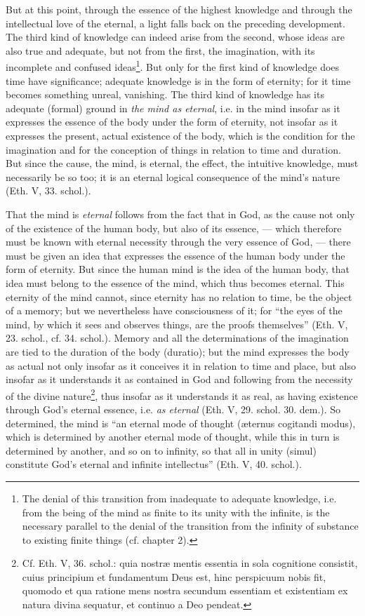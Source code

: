 \documentclass[12pt,a4paper,openany]{book}
\newcommand{\opage}[1]{\marginnote{\footnotesize\textit{[#1]}}}
\begin{document}
But at this point, through the essence of the highest
knowledge and through the intellectual love
of the eternal, a light falls back on the preceding development.
The third kind of knowledge can indeed arise
from the second, whose ideas are also true and adequate,
but not from the first, the imagination, with its incomplete
and confused ideas\footnote{The denial of this transition from inadequate to adequate
knowledge, i.e. from the being of the mind as finite to its unity with
the infinite, is the necessary parallel to the denial of the transition
from the infinity of substance to existing finite things
(cf. chapter 2).}. But only for the first
kind of knowledge does time have significance; adequate knowledge
is in the form of eternity; for it time becomes something
unreal, vanishing. The third kind of knowledge has its
adequate (formal) ground in \emph{the mind as eternal}, i.e. in the mind
insofar as it expresses the essence of the body under the form of
eternity, not insofar as it expresses the present,
actual existence of the body, which is the condition for the imagination and
for the conception of things in relation to time and duration.
But since the cause, the mind, is eternal, the effect, the
intuitive knowledge, must necessarily be so too; it is
an eternal logical consequence of the mind's nature (Eth. V, 33. schol.).

That the mind is \emph{eternal} follows from the fact that in God, as the
cause not only of the existence of the human body,
\opage{168}\setcounter{footnote}{0}but also of its essence, --- which therefore must be known with eternal necessity
through the very essence of God, --- there must
be given an idea that expresses the essence of the human body
under the form of eternity. But since the human
mind is the idea of the human body, that idea must
belong to the essence of the mind, which thus becomes eternal. This
eternity of the mind cannot, since eternity has no relation
to time, be the object of a memory; but we nevertheless have
consciousness of it; for ``the eyes of the mind, by which it
sees and observes things, are the proofs themselves'' (Eth. V,
23. schol., cf. 34. schol.). Memory and all the determinations
of the imagination are tied to the duration of the body
(duratio); but the mind expresses the body as actual not only
insofar as it conceives it in relation to time and place,
but also insofar as it understands it as contained in
God and following from the necessity of the divine nature\footnote{Cf. Eth. V, 36. schol.: quia nostræ mentis essentia in sola cognitione consistit, cuius principium et fundamentum Deus est, hinc
perspicuum nobis fit, quomodo et qua ratione mens nostra secundum essentiam et existentiam ex natura divina sequatur, et continuo a Deo pendeat.}, thus insofar as it understands it as real, as
having existence through God's eternal essence, i.e. \emph{as eternal}
(Eth. V, 29. schol. 30. dem.). So determined, the mind is
``an eternal mode of thought (æternus cogitandi modus), which is determined
by another eternal mode of thought, while this
in turn is determined by another, and so on to infinity,
so that all in unity (simul) constitute God's eternal
and infinite intellectus'' (Eth. V, 40. schol.). %
\end{document}
